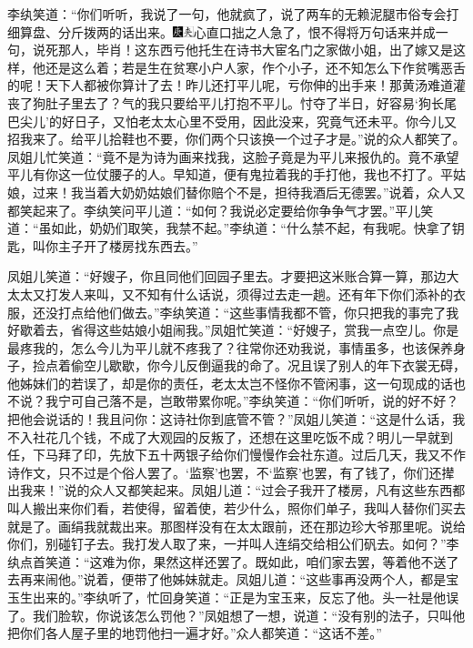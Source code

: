 李纨笑道：“你们听听，我说了一句，他就疯了，说了两车的无赖泥腿市俗专会打细算盘、分斤拨两的话出来。{\includegraphics[width=3mm]{../Images/00004}\includegraphics[width=3mm]{../Images/00012}\footnotesize \kaishu 心直口拙之人急了，恨不得将万句话来并成一句，说死那人，毕肖！}这东西亏他托生在诗书大宦名门之家做小姐，出了嫁又是这样，他还是这么着；若是生在贫寒小户人家，作个小子，还不知怎么下作贫嘴恶舌的呢！天下人都被你算计了去！昨儿还打平儿呢，亏你伸的出手来！那黄汤难道灌丧了狗肚子里去了？气的我只要给平儿打抱不平儿。忖夺了半日，好容易‘狗长尾巴尖儿’的好日子，又怕老太太心里不受用，因此没来，究竟气还未平。你今儿又招我来了。给平儿拾鞋也不要，你们两个只该换一个过子才是。”说的众人都笑了。凤姐儿忙笑道：“竟不是为诗为画来找我，这脸子竟是为平儿来报仇的。竟不承望平儿有你这一位仗腰子的人。早知道，便有鬼拉着我的手打他，我也不打了。平姑娘，过来！我当着大奶奶姑娘们替你赔个不是，担待我酒后无德罢。”说着，众人又都笑起来了。李纨笑问平儿道：“如何？我说必定要给你争争气才罢。”平儿笑道：“虽如此，奶奶们取笑，我禁不起。”李纨道：“什么禁不起，有我呢。快拿了钥匙，叫你主子开了楼房找东西去。”

凤姐儿笑道：“好嫂子，你且同他们回园子里去。才要把这米账合算一算，那边大太太又打发人来叫，又不知有什么话说，须得过去走一趟。还有年下你们添补的衣服，还没打点给他们做去。”李纨笑道：“这些事情我都不管，你只把我的事完了我好歇着去，省得这些姑娘小姐闹我。”凤姐忙笑道：“好嫂子，赏我一点空儿。你是最疼我的，怎么今儿为平儿就不疼我了？往常你还劝我说，事情虽多，也该保养身子，捡点着偷空儿歇歇，你今儿反倒逼我的命了。况且误了别人的年下衣裳无碍，他姊妹们的若误了，却是你的责任，老太太岂不怪你不管闲事，这一句现成的话也不说？我宁可自己落不是，岂敢带累你呢。”李纨笑道：“你们听听，说的好不好？把他会说话的！我且问你：这诗社你到底管不管？”凤姐儿笑道：“这是什么话，我不入社花几个钱，不成了大观园的反叛了，还想在这里吃饭不成？明儿一早就到任，下马拜了印，先放下五十两银子给你们慢慢作会社东道。过后几天，我又不作诗作文，只不过是个俗人罢了。‘监察’也罢，不‘监察’也罢，有了钱了，你们还撵出我来！”说的众人又都笑起来。凤姐儿道：“过会子我开了楼房，凡有这些东西都叫人搬出来你们看，若使得，留着使，若少什么，照你们单子，我叫人替你们买去就是了。画绢我就裁出来。那图样没有在太太跟前，还在那边珍大爷那里呢。说给你们，别碰钉子去。我打发人取了来，一并叫人连绢交给相公们矾去。如何？”李纨点首笑道：“这难为你，果然这样还罢了。既如此，咱们家去罢，等着他不送了去再来闹他。”说着，便带了他姊妹就走。凤姐儿道：“这些事再没两个人，都是宝玉生出来的。”李纨听了，忙回身笑道：“正是为宝玉来，反忘了他。头一社是他误了。我们脸软，你说该怎么罚他？”凤姐想了一想，说道：“没有别的法子，只叫他把你们各人屋子里的地罚他扫一遍才好。”众人都笑道：“这话不差。”

